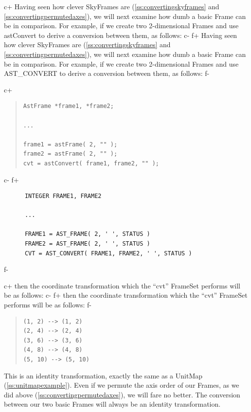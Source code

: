 \documentclass[twoside,11pt]{article}
\newcommand{\secref}[1]{\S\ref{#1}}
\renewcommand{\secref}[1]{\ref{#1}}
\begin{document}
c+
Having seen how clever SkyFrames are (\secref{ss:convertingskyframes}
and \secref{ss:convertingpermutedaxes}), we will next examine how dumb
a basic Frame can be in comparison. For example, if we create two
2-dimensional Frames and use astConvert to derive a conversion between
them, as follows:
c-
f+
Having seen how clever SkyFrames are (\secref{ss:convertingskyframes}
and \secref{ss:convertingpermutedaxes}), we will next examine how dumb
a basic Frame can be in comparison. For example, if we create two
2-dimensional Frames and use AST\_CONVERT to derive a conversion
between them, as follows:
f-

c+
\begin{quote}
\small
\begin{verbatim}
AstFrame *frame1, *frame2;

...

frame1 = astFrame( 2, "" );
frame2 = astFrame( 2, "" );
cvt = astConvert( frame1, frame2, "" );
\end{verbatim}
\normalsize
\end{quote}
c-
f+
\small
\begin{verbatim}
      INTEGER FRAME1, FRAME2

      ...

      FRAME1 = AST_FRAME( 2, ' ', STATUS )
      FRAME2 = AST_FRAME( 2, ' ', STATUS )
      CVT = AST_CONVERT( FRAME1, FRAME2, ' ', STATUS )
\end{verbatim}
\normalsize
f-

c+
then the coordinate transformation which the ``cvt'' FrameSet performs
will be as follows:
c-
f+
then the coordinate transformation which the ``cvt'' FrameSet performs
will be as follows:
f-

\begin{quote}
\begin{verbatim}
(1, 2) --> (1, 2)
(2, 4) --> (2, 4)
(3, 6) --> (3, 6)
(4, 8) --> (4, 8)
(5, 10) --> (5, 10)
\end{verbatim}
\end{quote}

This is an identity transformation, exactly the same as a UnitMap
(\secref{ss:unitmapexample}). Even if we permute the axis order of our
Frames, as we did above (\secref{ss:convertingpermutedaxes}), we will
fare no better. The conversion between our two basic Frames will
always be an identity transformation.
\end{document}
